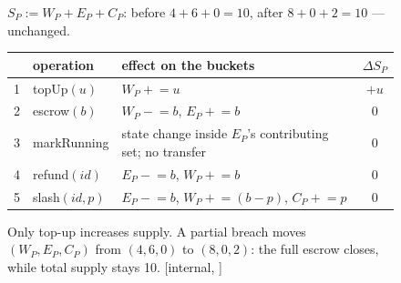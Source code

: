 \begin{figure}[H]
\medskip
{\footnotesize\centering
$S_P := W_P + E_P + C_P$: before $4+6+0=10$, after $8+0+2=10$ --- unchanged.
\par}

\medskip
{\footnotesize
\begin{tabularx}{\linewidth}{@{}c l >{\raggedright\arraybackslash}X c@{}}
\toprule
 & operation & effect on the buckets & $\Delta S_P$ \\
\midrule
1 & topUp$(u)$ & $W_P \mathrel{+}= u$ & $+u$ \\
2 & escrow$(b)$ & $W_P \mathrel{-}= b$, $E_P \mathrel{+}= b$ & $0$ \\
3 & markRunning & state change inside $E_P$'s contributing set; no transfer & $0$ \\
4 & refund$(\mathit{id})$ & $E_P \mathrel{-}= b$, $W_P \mathrel{+}= b$ & $0$ \\
5 & slash$(\mathit{id},p)$ & $E_P \mathrel{-}= b$, $W_P \mathrel{+}= (b{-}p)$, $C_P \mathrel{+}= p$ & $0$ \\
\bottomrule
\end{tabularx}}
\caption{Only top-up increases supply. A partial breach moves $(W_P,E_P,C_P)$ from $(4,6,0)$ to $(8,0,2)$: the full escrow closes, while total supply stays 10. [internal, \protect{}]}
\label{fig:bonded-conservation-ledger}
\end{figure}
